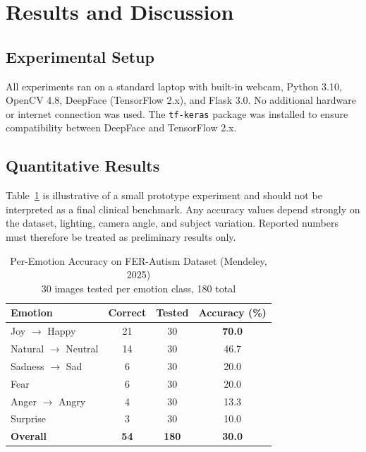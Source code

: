 \documentclass[conference]{IEEEtran}
\begin{document}
\section{Results and Discussion}

\subsection{Experimental Setup}

All experiments ran on a standard laptop with built-in
webcam, Python 3.10, OpenCV 4.8, DeepFace (TensorFlow 2.x),
and Flask 3.0. No additional hardware or internet connection
was used. The \texttt{tf-keras} package was installed to
ensure compatibility between DeepFace and TensorFlow 2.x.

\subsection{Quantitative Results}

Table~\ref{tab:results} is illustrative of a small prototype
experiment and should not be interpreted as a final clinical
benchmark. Any accuracy values depend strongly on the dataset,
lighting, camera angle, and subject variation. Reported numbers
must therefore be treated as preliminary results only.

\begin{table}[h]
\centering
\caption{Per-Emotion Accuracy on FER-Autism Dataset (Mendeley, 2025)\\
\small{30 images tested per emotion class, 180 total}}
\label{tab:results}
\renewcommand{\arraystretch}{1.25}
\begin{tabular}{|l|c|c|c|}
\hline
\textbf{Emotion} & \textbf{Correct} &
\textbf{Tested} & \textbf{Accuracy (\%)} \\
\hline
Joy $\rightarrow$ Happy     & 21 & 30 & \textbf{70.0} \\
\hline
Natural $\rightarrow$ Neutral & 14 & 30 & 46.7 \\
\hline
Sadness $\rightarrow$ Sad   & 6  & 30 & 20.0 \\
\hline
Fear                         & 6  & 30 & 20.0 \\
\hline
Anger $\rightarrow$ Angry   & 4  & 30 & 13.3 \\
\hline
Surprise                     & 3  & 30 & 10.0 \\
\hline
\textbf{Overall}             & \textbf{54} &
\textbf{180} & \textbf{30.0} \\
\hline
\end{tabular}
\end{table}
\end{document}
